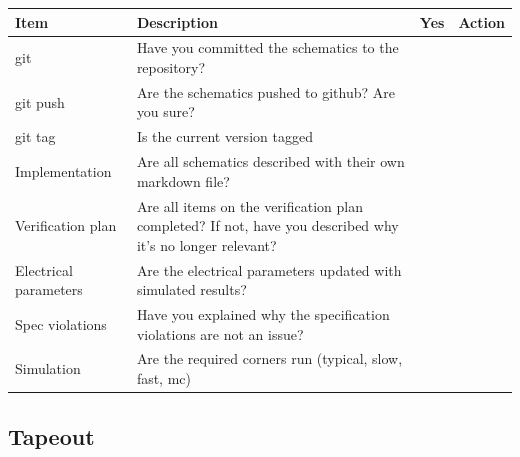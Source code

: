 \begin{longtable}[]{@{}
  >{\raggedright\arraybackslash}p{}
  >{\raggedright\arraybackslash}p{}
  >{\raggedright\arraybackslash}p{}
  >{\raggedright\arraybackslash}p{}@{}}
\toprule\noalign{}
\begin{minipage}[b]{\linewidth}\raggedright
Item
\end{minipage} & \begin{minipage}[b]{\linewidth}\raggedright
Description
\end{minipage} & \begin{minipage}[b]{\linewidth}\raggedright
Yes
\end{minipage} & \begin{minipage}[b]{\linewidth}\raggedright
Action
\end{minipage} \\
\midrule\noalign{}
\endhead
\bottomrule\noalign{}
\endlastfoot
git & Have you committed the schematics to the repository? & & \\
git push & Are the schematics pushed to github? Are you sure? & & \\
git tag & Is the current version tagged & & \\
Implementation & Are all schematics described with their own markdown
file? & & \\
Verification plan & Are all items on the verification plan completed? If
not, have you described why it's no longer relevant? & & \\
Electrical parameters & Are the electrical parameters updated with
simulated results? & & \\
Spec violations & Have you explained why the specification violations
are not an issue? & & \\
Simulation & Are the required corners run (typical, slow, fast, mc) &
& \\
\end{longtable}

\subsection{Tapeout}\label{tapeout}

